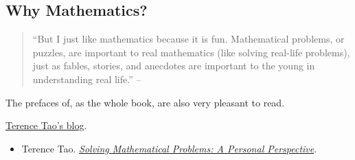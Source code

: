 \documentclass{article}
\numberwithin{equation}{section}
\begin{document}
\subsection{Why Mathematics?}
\begin{quotation}
	``But I just like mathematics because it is fun. Mathematical problems, or puzzles, are important to real mathematics (like solving real-life problems), just as fables, stories, and anecdotes are important to the young in understanding real life.'' -- \cite[Preface, p. viii]{Tao2006}
\end{quotation}
The prefaces of, as the whole book, \cite{Tao2006} are also very pleasant to read.


\begin{thebibliography}{99}
	 \href{https://terrytao.wordpress.com}{Terence Tao's blog}.
	\begin{itemize}
		\item Terence Tao. \href{https://terrytao.wordpress.com/books/solving-mathematical-problems-a-personal-perspective/}{\textit{Solving Mathematical Problems: A Personal Perspective}}.
	\end{itemize}
\end{thebibliography}

\printbibliography[heading=bibintoc]
\end{document}
